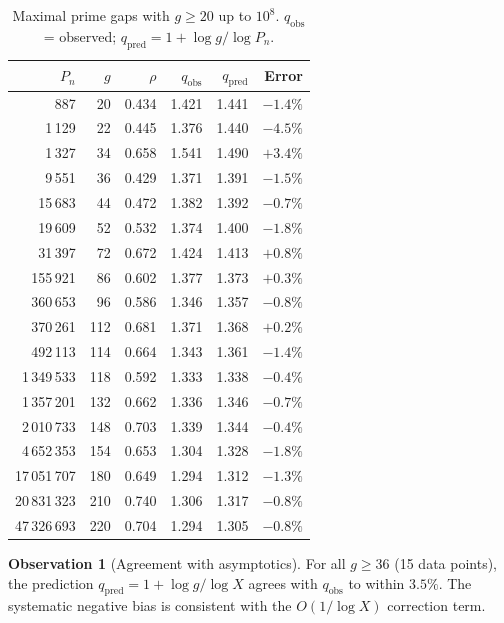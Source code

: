 \documentclass[11pt, a4paper]{article}
\theoremstyle{definition}
\newtheorem{observation}[theorem]{Observation}
\theoremstyle{remark}
\begin{document}
\begin{table}[H]
\centering
\caption{Maximal prime gaps with $g \ge 20$ up to $10^8$.
$q_{\mathrm{obs}}$ = observed;
$q_{\mathrm{pred}} = 1 + \log g / \log P_n$.}
\label{tab:data}
\medskip
\begin{tabular}{@{}r r r r r r@{}}
\toprule
$P_n$ & $g$ & $\rho$ & $q_{\mathrm{obs}}$ &
$q_{\mathrm{pred}}$ & Error \\
\midrule
887         & 20  & 0.434 & 1.421 & 1.441 & $-1.4\%$ \\
1\,129      & 22  & 0.445 & 1.376 & 1.440 & $-4.5\%$ \\
1\,327      & 34  & 0.658 & 1.541 & 1.490 & $+3.4\%$ \\
9\,551      & 36  & 0.429 & 1.371 & 1.391 & $-1.5\%$ \\
15\,683     & 44  & 0.472 & 1.382 & 1.392 & $-0.7\%$ \\
19\,609     & 52  & 0.532 & 1.374 & 1.400 & $-1.8\%$ \\
31\,397     & 72  & 0.672 & 1.424 & 1.413 & $+0.8\%$ \\
155\,921    & 86  & 0.602 & 1.377 & 1.373 & $+0.3\%$ \\
360\,653    & 96  & 0.586 & 1.346 & 1.357 & $-0.8\%$ \\
370\,261    & 112 & 0.681 & 1.371 & 1.368 & $+0.2\%$ \\
492\,113    & 114 & 0.664 & 1.343 & 1.361 & $-1.4\%$ \\
1\,349\,533 & 118 & 0.592 & 1.333 & 1.338 & $-0.4\%$ \\
1\,357\,201 & 132 & 0.662 & 1.336 & 1.346 & $-0.7\%$ \\
2\,010\,733 & 148 & 0.703 & 1.339 & 1.344 & $-0.4\%$ \\
4\,652\,353 & 154 & 0.653 & 1.304 & 1.328 & $-1.8\%$ \\
17\,051\,707& 180 & 0.649 & 1.294 & 1.312 & $-1.3\%$ \\
20\,831\,323& 210 & 0.740 & 1.306 & 1.317 & $-0.8\%$ \\
47\,326\,693& 220 & 0.704 & 1.294 & 1.305 & $-0.8\%$ \\
\bottomrule
\end{tabular}
\end{table}

\begin{observation}[Agreement with asymptotics]
\label{obs:agreement}
For all $g \ge 36$ (15 data points), the prediction
$q_{\mathrm{pred}} = 1 + \log g / \log X$
agrees with $q_{\mathrm{obs}}$ to within $3.5\%$.
The systematic negative bias is consistent with the
$O(1/\log X)$ correction term.
\end{observation}
\end{document}
